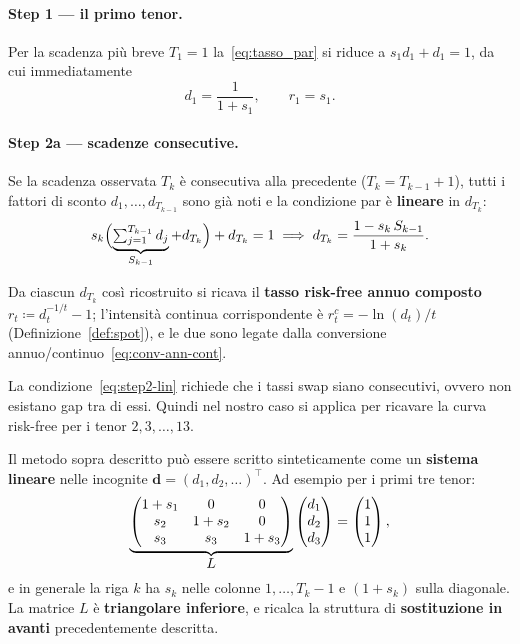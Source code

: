 \documentclass[11pt,a4paper]{article}
\theoremstyle{plain}
\theoremstyle{definition}
\theoremstyle{remark}
\newcommand{\defeq}{\coloneqq}
\begin{document}
\paragraph{Step 1 --- il primo tenor.}
Per la scadenza pi\`u breve $T_1=1$ la~\eqref{eq:tasso_par} si riduce a $s_1 d_1+d_1=1$, da
cui immediatamente
\begin{equation}
  \label{eq:step1}
  d_1 = \frac{1}{1+s_1}, \qquad r_1 = s_1.
\end{equation}

\paragraph{Step 2a --- scadenze consecutive.}
Se la scadenza osservata $T_{k}$ \`e consecutiva alla precedente ($T_{k}=T_{k-1}+1$), tutti i
fattori di sconto $d_1,\dots,d_{T_{k-1}}$ sono gi\`a noti e la condizione par \`e
\textbf{lineare} in $d_{T_k}$:
\begin{equation}
  \label{eq:step2-lin}
  s_{k}\Bigl(\underbrace{\textstyle\sum_{j=1}^{T_{k-1}} d_j}_{S_{k-1}} + d_{T_k}\Bigr)
  + d_{T_k} = 1
  \;\Longrightarrow\;
  d_{T_k} = \frac{1 - s_{k}\,S_{k-1}}{1 + s_{k}}.
\end{equation}

Da ciascun $d_{T_k}$ cos\`i ricostruito si ricava il \textbf{tasso risk-free annuo composto}
$r_t \defeq d_t^{-1/t}-1$; l'intensit\`a continua corrispondente \`e $r^c_t = -\ln(d_t)/t$
(Definizione~\ref{def:spot}), e le due sono legate dalla conversione
annuo/continuo~\eqref{eq:conv-ann-cont}.

La condizione~\eqref{eq:step2-lin} richiede che i tassi swap siano consecutivi, ovvero non esistano gap tra di essi. Quindi nel nostro caso si applica per ricavare la curva risk-free per i tenor $2,3,\dots,13$.


Il metodo sopra descritto pu\`o essere scritto sinteticamente come un \textbf{sistema lineare}
nelle incognite $\mathbf d=(d_1,d_2,\ldots)^\top$. Ad esempio per i primi tre tenor:
\begin{equation}
  \label{eq:boot-tri}
  \underbrace{%
  \begin{pmatrix}
    1+s_1 & 0     & 0     \\
    s_2   & 1+s_2 & 0     \\
    s_3   & s_3   & 1+s_3
  \end{pmatrix}}_{\displaystyle L}
  \begin{pmatrix} d_1 \\ d_2 \\ d_3 \end{pmatrix}
  =
  \begin{pmatrix} 1 \\ 1 \\ 1 \end{pmatrix},
\end{equation}
e in generale la riga $k$ ha $s_k$ nelle colonne $1,\dots,T_k-1$ e $(1+s_k)$ sulla diagonale.
La matrice $L$ \`e \textbf{triangolare inferiore}, e ricalca la struttura di \textbf{sostituzione in avanti} precedentemente descritta.
\end{document}
